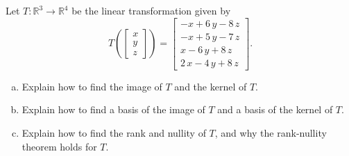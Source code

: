 
\begin{exerciseStatement}
 Let \(T:\mathbb{R}^ 3  \to \mathbb{R}^ 4 \) be the linear transformation given by \[T\left(  \left[\begin{array}{c}
x \\
y \\
z
\end{array}\right]  \right) =  \left[\begin{array}{c}
-x + 6 \, y - 8 \, z \\
-x + 5 \, y - 7 \, z \\
x - 6 \, y + 8 \, z \\
2 \, x - 4 \, y + 8 \, z
\end{array}\right] .\]
\begin{enumerate}[(a)]
\item Explain how to find the image of \(T\) and the kernel of \(T\).
\item Explain how to find a basis of the image of \(T\) and a basis of the kernel of \(T\).
\item Explain how to find the rank and nullity of \(T\), and why the rank-nullity theorem holds for \(T\).
\end{enumerate}
    
\end{exerciseStatement}
    

